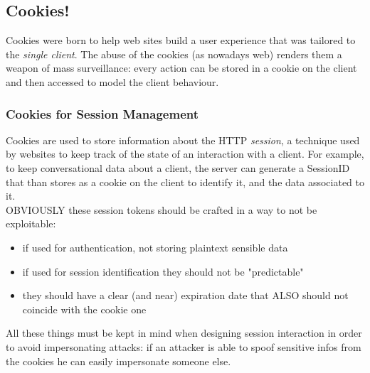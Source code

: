 \documentclass{article}
\begin{document}
			\subsection{Cookies!}
				Cookies were born to help web sites build a user experience that was tailored to the \emph{single client}. The abuse of the cookies (as nowadays web) renders them a weapon of mass surveillance: every action can be stored in a cookie on the client and then accessed to model the client behaviour.
				
				\subsubsection{Cookies for Session Management}
					Cookies are used to store information about the HTTP \emph{session}, a technique used by websites to keep track of the state of an interaction with a client. For example, to keep conversational data about a client, the server can generate a SessionID that than stores as a cookie on the client to identify it, and the data associated to it.\\
					OBVIOUSLY these session tokens should be crafted in a way to not be exploitable:
					\begin{itemize}
						\item if used for authentication, not storing plaintext sensible data
						\item if used for session identification they should not be "predictable"
						\item they should have a clear (and near) expiration date that ALSO should not coincide with the cookie one
					\end{itemize}
					All these things must be kept in mind when designing session interaction in order to avoid impersonating attacks: if an attacker is able to spoof sensitive infos from the cookies he can easily impersonate someone else. 
				
\end{document}
